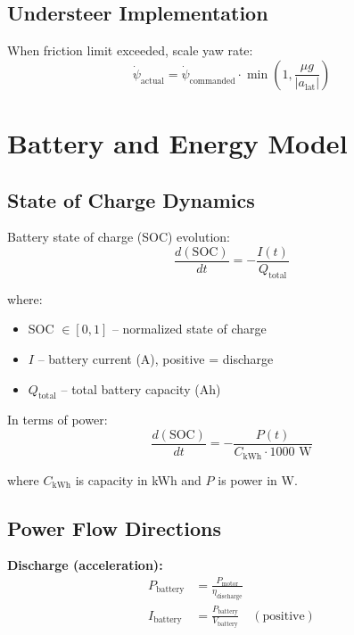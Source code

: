 \documentclass[11pt,a4paper]{article}
\begin{document}
\subsection{Understeer Implementation}

When friction limit exceeded, scale yaw rate:
\begin{equation}
\dot{\psi}_{\text{actual}} = \dot{\psi}_{\text{commanded}} \cdot \min\left(1, \frac{\mu g}{|a_{\text{lat}}|}\right)
\end{equation}

\section{Battery and Energy Model}

\subsection{State of Charge Dynamics}

Battery state of charge (SOC) evolution:
\begin{equation}
\frac{d(\text{SOC})}{dt} = -\frac{I(t)}{Q_{\text{total}}}
\end{equation}

where:
\begin{itemize}
    \item SOC $\in [0, 1]$ -- normalized state of charge
    \item $I$ -- battery current (A), positive = discharge
    \item $Q_{\text{total}}$ -- total battery capacity (Ah)
\end{itemize}

In terms of power:
\begin{equation}
\frac{d(\text{SOC})}{dt} = -\frac{P(t)}{C_{\text{kWh}} \cdot 1000 \text{ W}}
\end{equation}

where $C_{\text{kWh}}$ is capacity in kWh and $P$ is power in W.

\subsection{Power Flow Directions}

\textbf{Discharge (acceleration):}
\begin{align}
P_{\text{battery}} &= \frac{P_{\text{motor}}}{\eta_{\text{discharge}}} \\
I_{\text{battery}} &= \frac{P_{\text{battery}}}{V_{\text{battery}}} \quad (\text{positive})
\end{align}
\end{document}
